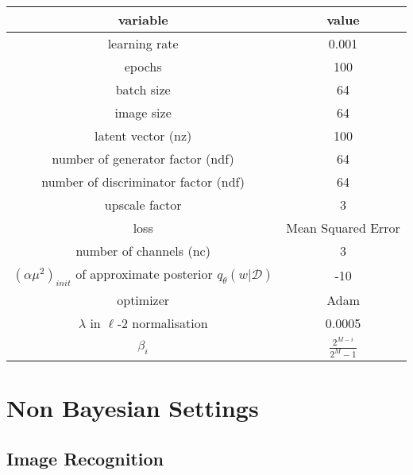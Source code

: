 \begin{table}[H]
    \centering
    \renewcommand{\arraystretch}{2}
    \begin{tabular}[c]{c | c} 
     \hline
     variable & value \\ [0.5ex] 
     \hline
     learning rate &  0.001\\ 
     
     epochs & 100 \\
     
     batch size & 64 \\
     
     image size & 64 \\
     
     latent vector (nz) & 100 \\
     
     number of generator factor (ndf) & 64 \\
     
     number of discriminator factor (ndf) & 64 \\
     
     upscale factor & 3 \\
     
     loss & Mean Squared Error \\
     
     number of channels (nc) & 3 \\
     
     $(\alpha \mu^2)_{init}$ of approximate posterior $q_{\theta}(w|\mathcal{D})$ & -10 \\
     
     optimizer & Adam \cite{kingma2014adam} \\
     
     $\lambda$ in $\ell$-2 normalisation & 0.0005 \\
    
     $\beta_i$ & $\frac{2^{M-i}}{2^M-1}$ \cite{blundell2015weight} \\ [1ex] 
     \hline
    \end{tabular} 
    \renewcommand{\arraystretch}{2}
\end{table}

\section*{Non Bayesian Settings}

\subsection{Image Recognition}

